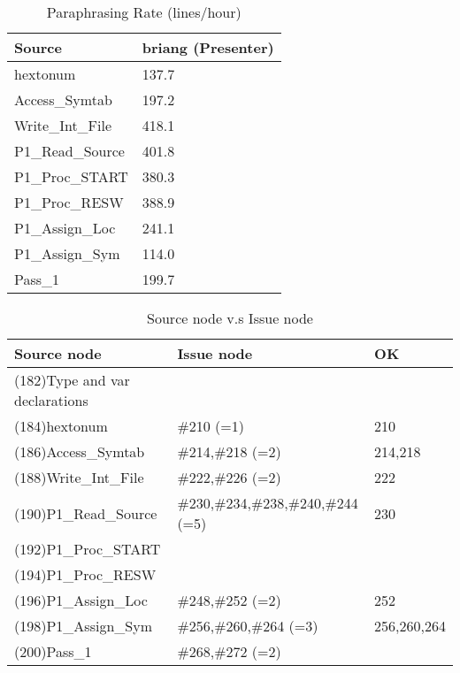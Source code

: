 \begin{table}[hb]
\begin{center}
\begin{tabular}{|l|l|}
\hline
Source & briang (Presenter)\\
\hline
hextonum & 137.7\\
Access\_Symtab & 197.2\\
Write\_Int\_File & 418.1\\
P1\_Read\_Source & 401.8\\
P1\_Proc\_START & 380.3\\
P1\_Proc\_RESW & 388.9\\
P1\_Assign\_Loc & 241.1\\
P1\_Assign\_Sym & 114.0\\
Pass\_1 & 199.7\\
\hline
\end{tabular}
\end{center}
\caption{Paraphrasing Rate (lines/hour)}
\end{table}


\begin{table}[hb]
\begin{center}
\begin{tabular}{|l|l|l|}
\hline
Source node & Issue node  & OK\\
\hline
(182)Type and var declarations &  & \\
(184)hextonum & \#210 (=1) & 210\\
(186)Access\_Symtab & \#214,\#218 (=2) & 214,218\\
(188)Write\_Int\_File & \#222,\#226 (=2) & 222\\
(190)P1\_Read\_Source & \#230,\#234,\#238,\#240,\#244 (=5) & 230\\
(192)P1\_Proc\_START &  & \\
(194)P1\_Proc\_RESW &  & \\
(196)P1\_Assign\_Loc & \#248,\#252 (=2) & 252\\
(198)P1\_Assign\_Sym & \#256,\#260,\#264 (=3) & 256,260,264\\
(200)Pass\_1 & \#268,\#272 (=2) & \\
\hline
\end{tabular}
\caption{Source node v.s Issue node}
\end{center}
\end{table}

